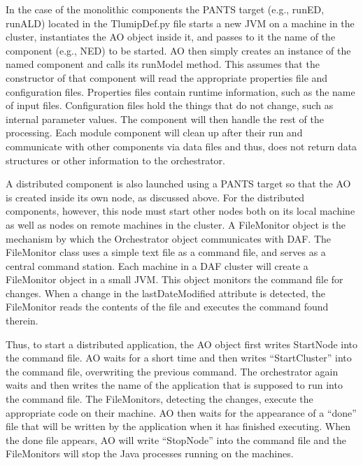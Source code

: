 In the case of the monolithic components the PANTS target (e.g., runED, runALD) located in the TlumipDef.py file starts a new JVM on a machine in the cluster, instantiates the AO object inside it, and passes to it the name of the component (e.g., NED) to be started. AO then simply creates an instance of the named component and calls its runModel method. This assumes that the constructor of that component will read the appropriate properties file and configuration files. Properties files contain runtime information, such as the name of input files. Configuration files hold the things that do not change, such as internal parameter values. The component will then handle the rest of the processing. Each module component will clean up after their run and communicate with other components via data files and thus, does not return data structures or other information to the orchestrator. 

A distributed component is also launched using a PANTS target so that the AO is created inside its own node, as discussed above. For the distributed components, however, this node must start other nodes both on its local machine as well as nodes on remote machines in the cluster. A FileMonitor object is the mechanism by which the Orchestrator object communicates with DAF. The FileMonitor class uses a simple text file as a command file, and serves as a central command station. Each machine in a DAF cluster will create a FileMonitor object in a small JVM. This object monitors the command file for changes. When a change in the lastDateModified attribute is detected, the FileMonitor reads the contents of the file and executes the command found therein. 

Thus, to start a distributed application, the AO object first writes StartNode into the command file. AO waits for a short time and then writes ``StartCluster'' into the command file, overwriting the previous command. The orchestrator again waits and then writes the name of the application that is supposed to run into the command file. The FileMonitors, detecting the changes, execute the appropriate code on their machine. AO then waits for the appearance of a ``done'' file that will be written by the application when it has finished executing. When the done file appears, AO will write ``StopNode'' into the command file and the FileMonitors will stop the Java processes running on the machines.


